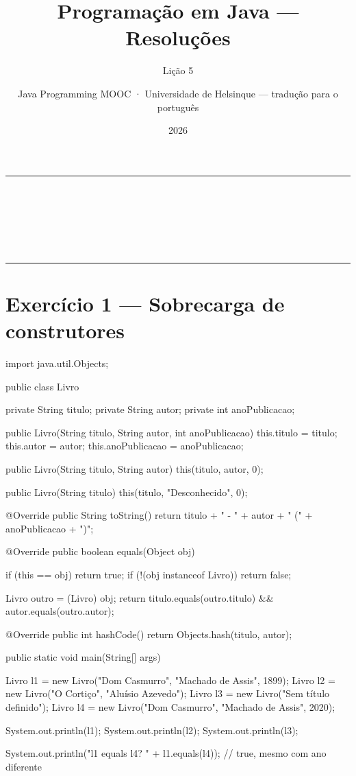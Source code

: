\documentclass[11pt,a4paper]{article}
\title{Programação em Java — Resoluções}
\subtitle{Lição 5}
\author{Java Programming MOOC · Universidade de Helsinque — tradução para o português}
\date{2026}
\makeatletter
\renewcommand{\maketitle}{%
  \begin{center}
    {\color{javaRule}\rule{\linewidth}{1pt}}\\[6pt]
    {\Huge\sffamily\bfseries\color{javaOrange} \@title}\\[6pt]
    \ifx\@subtitle\undefined\else
      {\Large\sffamily\color{javaDeep} \@subtitle}\\[4pt]
    \fi
    {\small\sffamily\color{gray} \@author}\\[2pt]
    {\small\sffamily\color{gray} \@date}\\[6pt]
    {\color{javaRule}\rule{\linewidth}{1pt}}
  \end{center}
  \vspace{1em}
}
\makeatother
\begin{document}
\maketitle
\tableofcontents
\vspace{1.5em}

\section{Exercício 1 --- Sobrecarga de construtores}

\begin{javacode}
import java.util.Objects;

public class Livro {
    private String titulo;
    private String autor;
    private int anoPublicacao;

    public Livro(String titulo, String autor, int anoPublicacao) {
        this.titulo = titulo;
        this.autor = autor;
        this.anoPublicacao = anoPublicacao;
    }

    public Livro(String titulo, String autor) {
        this(titulo, autor, 0);
    }

    public Livro(String titulo) {
        this(titulo, "Desconhecido", 0);
    }

    @Override
    public String toString() {
        return titulo + " - " + autor + " (" + anoPublicacao + ")";
    }

    @Override
    public boolean equals(Object obj) {
        if (this == obj) return true;
        if (!(obj instanceof Livro)) return false;

        Livro outro = (Livro) obj;
        return titulo.equals(outro.titulo) && autor.equals(outro.autor);
    }

    @Override
    public int hashCode() {
        return Objects.hash(titulo, autor);
    }

    public static void main(String[] args) {
        Livro l1 = new Livro("Dom Casmurro", "Machado de Assis", 1899);
        Livro l2 = new Livro("O Cortiço", "Aluísio Azevedo");
        Livro l3 = new Livro("Sem título definido");
        Livro l4 = new Livro("Dom Casmurro", "Machado de Assis", 2020);

        System.out.println(l1);
        System.out.println(l2);
        System.out.println(l3);

        System.out.println("l1 equals l4? " + l1.equals(l4)); // true, mesmo com ano diferente
    }
}
\end{javacode}
\end{document}
